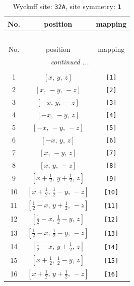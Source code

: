 \documentclass[fleqn,8pt]{jsarticle}
\begin{document}
\renewcommand{\arraystretch}{1.2}
\begin{longtable}{ccc}
\caption{Wyckoff site: {\tt 32A}, site symmetry: {\tt 1}}
 \\
 \hline \hline
No. & position & mapping \\ \hline \endfirsthead

\multicolumn{2}{l}{\tablename\ \thetable{}} \\
 \hline \hline
No. & position & mapping \\ \hline \endhead

 \hline \hline
\multicolumn{2}{r}{\footnotesize\it continued ...} \\ \endfoot

 \hline \hline
\multicolumn{2}{r}{} \\ \endlastfoot

1 & $\left[ x,\, y,\, z \right]$ & {\tt [1]} \\ \hline
2 & $\left[ x,\, - y,\, - z \right]$ & {\tt [2]} \\ \hline
3 & $\left[ - x,\, y,\, - z \right]$ & {\tt [3]} \\ \hline
4 & $\left[ - x,\, - y,\, z \right]$ & {\tt [4]} \\ \hline
5 & $\left[ - x,\, - y,\, - z \right]$ & {\tt [5]} \\ \hline
6 & $\left[ - x,\, y,\, z \right]$ & {\tt [6]} \\ \hline
7 & $\left[ x,\, - y,\, z \right]$ & {\tt [7]} \\ \hline
8 & $\left[ x,\, y,\, - z \right]$ & {\tt [8]} \\ \hline
9 & $\left[ x + \frac{1}{2},\, y + \frac{1}{2},\, z \right]$ & {\tt [9]} \\ \hline
10 & $\left[ x + \frac{1}{2},\, \frac{1}{2} - y,\, - z \right]$ & {\tt [10]} \\ \hline
11 & $\left[ \frac{1}{2} - x,\, y + \frac{1}{2},\, - z \right]$ & {\tt [11]} \\ \hline
12 & $\left[ \frac{1}{2} - x,\, \frac{1}{2} - y,\, z \right]$ & {\tt [12]} \\ \hline
13 & $\left[ \frac{1}{2} - x,\, \frac{1}{2} - y,\, - z \right]$ & {\tt [13]} \\ \hline
14 & $\left[ \frac{1}{2} - x,\, y + \frac{1}{2},\, z \right]$ & {\tt [14]} \\ \hline
15 & $\left[ x + \frac{1}{2},\, \frac{1}{2} - y,\, z \right]$ & {\tt [15]} \\ \hline
16 & $\left[ x + \frac{1}{2},\, y + \frac{1}{2},\, - z \right]$ & {\tt [16]} \\ \hline

\end{longtable}
\end{document}
